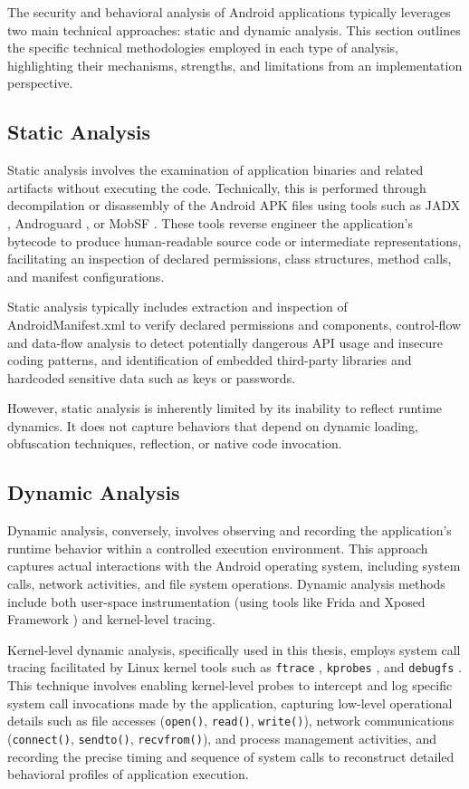 \documentclass[a4paper,12pt]{report}
\begin{document}
The security and behavioral analysis of Android applications typically leverages two main technical approaches: static and dynamic analysis. This section outlines the specific technical methodologies employed in each type of analysis, highlighting their mechanisms, strengths, and limitations from an implementation perspective.

\subsection{Static Analysis}

Static analysis involves the examination of application binaries and related artifacts without executing the code. Technically, this is performed through decompilation or disassembly of the Android APK files using tools such as JADX \cite{jadx}, Androguard \cite{androguard}, or MobSF \cite{mobsf}. These tools reverse engineer the application's bytecode to produce human-readable source code or intermediate representations, facilitating an inspection of declared permissions, class structures, method calls, and manifest configurations.

Static analysis typically includes extraction and inspection of AndroidManifest.xml to verify declared permissions and components, control-flow and data-flow analysis to detect potentially dangerous API usage and insecure coding patterns, and identification of embedded third-party libraries and hardcoded sensitive data such as keys or passwords.

However, static analysis is inherently limited by its inability to reflect runtime dynamics. It does not capture behaviors that depend on dynamic loading, obfuscation techniques, reflection, or native code invocation.

\subsection{Dynamic Analysis}

Dynamic analysis, conversely, involves observing and recording the application's runtime behavior within a controlled execution environment. This approach captures actual interactions with the Android operating system, including system calls, network activities, and file system operations. Dynamic analysis methods include both user-space instrumentation (using tools like Frida \cite{frida} and Xposed Framework \cite{xposed}) and kernel-level tracing.

Kernel-level dynamic analysis, specifically used in this thesis, employs system call tracing facilitated by Linux kernel tools such as \texttt{ftrace} \cite{ftrace}, \texttt{kprobes} \cite{kprobes}, and \texttt{debugfs} \cite{debugfs}. This technique involves enabling kernel-level probes to intercept and log specific system call invocations made by the application, capturing low-level operational details such as file accesses (\texttt{open()}, \texttt{read()}, \texttt{write()}), network communications (\texttt{connect()}, \texttt{sendto()}, \texttt{recvfrom()}), and process management activities, and recording the precise timing and sequence of system calls to reconstruct detailed behavioral profiles of application execution.
\end{document}
